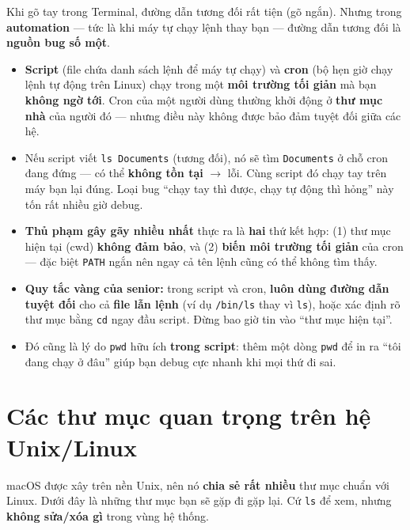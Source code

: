 \documentclass[12pt,a4paper]{article}
\begin{document}
\begin{seniorbox}[title={Góc Senior \#2 --- Vì sao đường dẫn tuyệt đối quan trọng sống còn}]
Khi gõ tay trong Terminal, đường dẫn tương đối rất tiện (gõ ngắn). Nhưng trong \textbf{automation} --- tức là khi máy tự chạy lệnh thay bạn --- đường dẫn tương đối là \textbf{nguồn bug số một}.

\begin{itemize}[leftmargin=*]
  \item \textbf{Script} (file chứa danh sách lệnh để máy tự chạy) và \textbf{cron} (bộ hẹn giờ chạy lệnh tự động trên Linux) chạy trong một \textbf{môi trường tối giản} mà bạn \textbf{không ngờ tới}. Cron của một người dùng thường khởi động ở \textbf{thư mục nhà} của người đó --- nhưng điều này không được bảo đảm tuyệt đối giữa các hệ.
  \item Nếu script viết \texttt{ls Documents} (tương đối), nó sẽ tìm \texttt{Documents} ở chỗ cron đang đứng --- có thể \textbf{không tồn tại} $\rightarrow$ lỗi. Cùng script đó chạy tay trên máy bạn lại đúng. Loại bug ``chạy tay thì được, chạy tự động thì hỏng'' này tốn rất nhiều giờ debug.
  \item \textbf{Thủ phạm gây gãy nhiều nhất} thực ra là \textbf{hai} thứ kết hợp: (1) thư mục hiện tại (cwd) \textbf{không đảm bảo}, và (2) \textbf{biến môi trường tối giản} của cron --- đặc biệt \texttt{PATH} ngắn nên ngay cả tên lệnh cũng có thể không tìm thấy.
  \item \textbf{Quy tắc vàng của senior:} trong script và cron, \textbf{luôn dùng đường dẫn tuyệt đối} cho cả \textbf{file lẫn lệnh} (ví dụ \texttt{/bin/ls} thay vì \texttt{ls}), hoặc xác định rõ thư mục bằng \texttt{cd} ngay đầu script. Đừng bao giờ tin vào ``thư mục hiện tại''.
  \item Đó cũng là lý do \texttt{pwd} hữu ích \textbf{trong script}: thêm một dòng \texttt{pwd} để in ra ``tôi đang chạy ở đâu'' giúp bạn debug cực nhanh khi mọi thứ đi sai.
\end{itemize}
\end{seniorbox}

\section{Các thư mục quan trọng trên hệ Unix/Linux}

macOS được xây trên nền Unix, nên nó \textbf{chia sẻ rất nhiều} thư mục chuẩn với Linux. Dưới đây là những thư mục bạn sẽ gặp đi gặp lại. Cứ \texttt{ls} để xem, nhưng \textbf{không sửa/xóa gì} trong vùng hệ thống.
\end{document}
